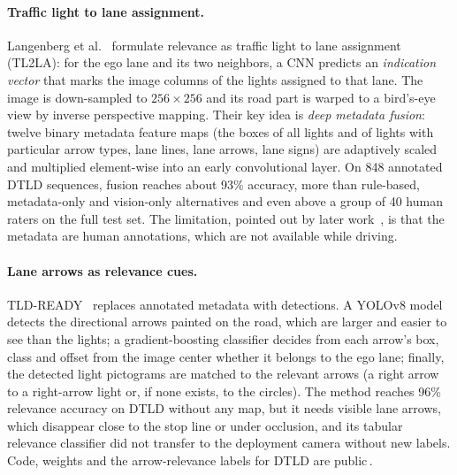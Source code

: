 \paragraph{Traffic light to lane assignment.} Langenberg et al.~\cite{langenberg2019deep} formulate
relevance as traffic light to lane assignment (TL2LA): for the ego lane and its two neighbors, a CNN
predicts an \emph{indication vector} that marks the image columns of the lights assigned to that lane.
The image is down-sampled to $256\times256$ and its road part is warped to a bird's-eye view by
inverse perspective mapping. Their key idea is \emph{deep metadata fusion}: twelve binary metadata
feature maps (the boxes of all lights and of lights with particular arrow types, lane lines, lane
arrows, lane signs) are adaptively scaled and multiplied element-wise into an early convolutional layer. On 848
annotated DTLD sequences, fusion reaches about 93\% accuracy, more than rule-based, metadata-only and
vision-only alternatives and even above a group of 40 human raters on the full test set. The
limitation, pointed out by later work~\cite{polley2024tldready,polley2025atlas}, is that the metadata
are human annotations, which are not available while driving.

\paragraph{Lane arrows as relevance cues.} TLD-READY~\cite{polley2024tldready} replaces annotated
metadata with detections. A YOLOv8 model detects the directional arrows painted on the road, which are
larger and easier to see than the lights; a gradient-boosting classifier decides from each arrow's box,
class and offset from the image center whether it belongs to the ego lane; finally, the detected light
pictograms are matched to the relevant arrows (a right arrow to a right-arrow light or, if none
exists, to the circles). The method reaches 96\% relevance accuracy on DTLD without any map, but it
needs visible lane arrows, which disappear close to the stop line or under occlusion, and its tabular
relevance classifier did not transfer to the deployment camera without new labels. Code, weights and
the arrow-relevance labels for DTLD are public\,.

